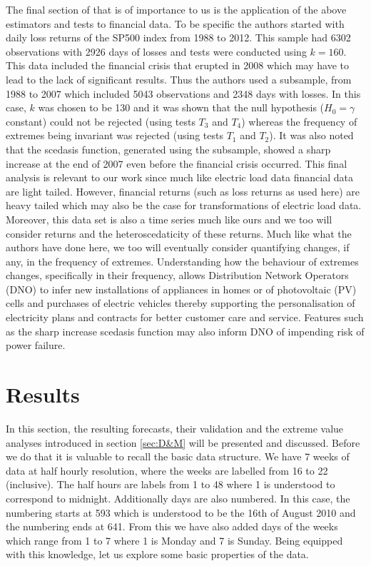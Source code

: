 \documentclass[a4paper]{article}
\begin{document}
The final section of \cite{einmahl16} that is of importance to us is the application of the above estimators and tests to financial data. To be specific the authors started with daily loss returns of the SP500 index from 1988 to 2012. This sample had 6302 observations with 2926 days of losses and tests were conducted using $k=160$. This data included the financial crisis that erupted in 2008 which may have to lead to the lack of significant results. Thus the authors used a subsample, from 1988 to 2007 which included 5043 observations and 2348 days with losses. In this case, $k$ was chosen to be 130 and it was shown that the null hypothesis ($H_0 = \gamma$ constant) could not be rejected (using tests $T_3$ and $T_4$) whereas the frequency of extremes being invariant was rejected (using tests $T_1$ and $T_2$).  It was also noted that the scedasis function, generated using the subsample, showed a sharp increase at the end of 2007 even before the financial crisis occurred. This final analysis is relevant to our work since much like electric load data %
financial data are light tailed. However, financial returns (such as loss returns as used here) are heavy tailed which may also be the case for transformations of electric load data. Moreover, this data set is also a time series much like ours and we too will consider returns and the heteroscedaticity of these returns. Much like what the authors have done here, we too will eventually consider quantifying changes, if any, in the frequency of extremes. Understanding how the behaviour of extremes changes, specifically in their frequency, allows Distribution Network Operators (DNO) to infer new installations of appliances in homes or of photovoltaic (PV) cells and purchases of electric vehicles thereby supporting the personalisation of electricity plans and contracts for better customer care and service. Features such as the sharp increase scedasis function may also inform DNO of impending risk of power failure.

 
\clearpage


\section{Results}
\label{sec:results}

In this section, the resulting forecasts, their validation and the extreme value analyses introduced in section \ref{sec:D&M} will be presented and discussed. Before we do that it is valuable to recall the basic data structure. We have 7 weeks of data at half hourly resolution, where the weeks are labelled from 16 to 22 (inclusive). The half hours are labels from 1 to 48 where 1 is understood to correspond to midnight. Additionally days are also numbered. In this case, the numbering starts at 593 which is understood to be the 16th of August 2010 and the numbering ends at 641. From this we have also added days of the weeks which range from 1 to 7 where 1 is Monday and 7 is Sunday. Being equipped with this knowledge, let us explore some basic properties of the data.
\end{document}

